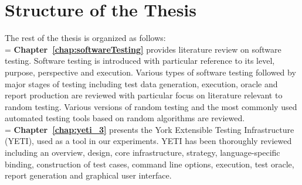 %



\section{Structure of the Thesis}
The rest of the thesis is organized as follows:\\

\hangindent=\parindent
{}
\noindent
\textbf{Chapter~\ref{chap:softwareTesting}} provides literature review on software testing. Software testing is introduced with particular reference to its level, purpose, perspective and execution. Various types of software testing followed by major stages of testing including test data generation, execution, oracle and report production are reviewed with particular focus on literature relevant to random testing. Various versions of random testing and the most commonly used automated testing tools based on random algorithms are reviewed. \\


\hangindent=\parindent
{}
\noindent
\textbf{Chapter~\ref{chap:yeti_3}} presents the York Extensible Testing Infrastructure (YETI), used as a tool in our experiments. YETI has been thoroughly reviewed including an overview, design, core infrastructure, strategy, language-specific binding, construction of test cases, command line options, execution, test oracle, report generation and graphical user interface.\\

